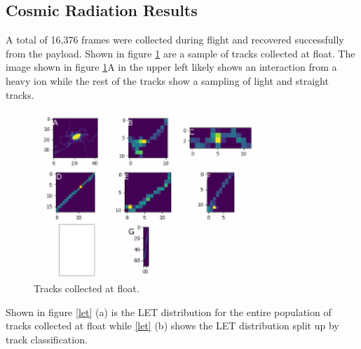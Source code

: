 \subsection{Cosmic Radiation Results}
\label{sec:Cosmic-Radiation-Results}

A total of 16,376 frames were collected during flight and recovered successfully from the payload. Shown in figure \ref{fig:tracks} are a sample of tracks collected at float. The image shown in figure \ref{fig:tracks}A in the upper left likely shows an interaction from a heavy ion while the rest of the tracks show a sampling of light and straight tracks. 


\begin{figure}[H]
	\begin{center}
	\includegraphics[width=0.75\textwidth]{figures/tracks.pdf}
	\caption{Tracks collected at float.}
	\label{fig:tracks}
	\end{center}
\end{figure}

Shown in figure \ref{let} (a) is the LET distribution for the entire population of tracks collected at float while \ref{let} (b) shows the LET distribution split up by track classification.

